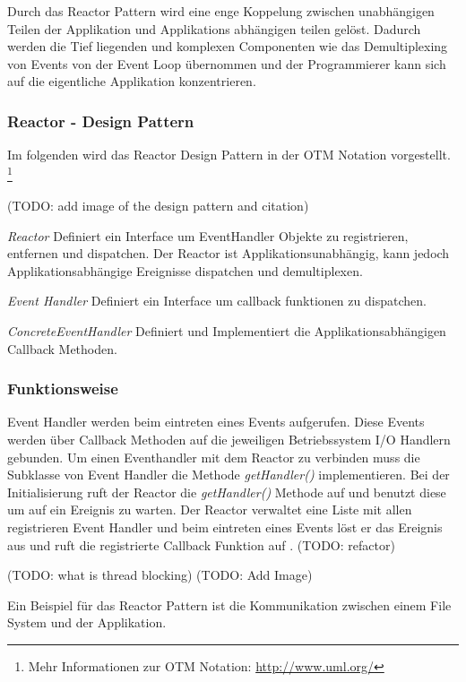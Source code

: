 Durch das Reactor Pattern wird eine enge Koppelung zwischen unabhängigen Teilen der Applikation und Applikations abhängigen teilen gelöst. Dadurch werden die Tief liegenden und komplexen Componenten wie das Demultiplexing von Events von der Event Loop übernommen und der Programmierer kann sich auf die eigentliche Applikation konzentrieren. \cite[p. 2]{Sch95}


\subsubsection{Reactor - Design Pattern}

Im folgenden wird das Reactor Design Pattern in der OTM Notation vorgestellt. \footnote[0]{Mehr Informationen zur OTM Notation: \url{http://www.uml.org/}}

(TODO: add image of the design pattern and citation)

\cite[p. 2]{Sch95}

\emph{Reactor}
	Definiert ein Interface um EventHandler Objekte zu registrieren, entfernen und dispatchen. Der Reactor ist Applikationsunabhängig, kann jedoch Applikationsabhängige Ereignisse dispatchen und demultiplexen.

\emph{Event Handler}
	Definiert ein Interface um callback funktionen zu dispatchen.

\emph{ConcreteEventHandler}
	Definiert und Implementiert die Applikationsabhängigen Callback Methoden.

\subsubsection{Funktionsweise}
Event Handler werden beim eintreten eines Events aufgerufen. Diese Events werden über Callback Methoden auf die jeweiligen Betriebssystem I/O Handlern gebunden. Um einen Eventhandler mit dem Reactor zu verbinden muss die Subklasse von Event Handler die Methode \emph{getHandler()} implementieren. Bei der Initialisierung ruft der Reactor die \emph{getHandler()} Methode auf und benutzt diese um auf ein Ereignis zu warten. Der Reactor verwaltet eine Liste mit allen registrieren Event Handler und beim eintreten eines Events löst er das Ereignis aus und ruft die registrierte Callback Funktion auf \cite[p. 5]{Sch95}. (TODO: refactor)

(TODO: what is thread blocking)
(TODO: Add Image)

Ein Beispiel für das Reactor Pattern ist die Kommunikation zwischen einem File System und der Applikation.


